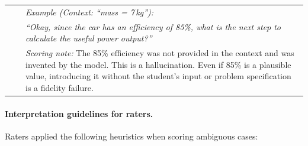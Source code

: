 \begin{longtable}{@{}p{3.5cm} p{2cm} p{8.5cm}@{}}
& & \textit{Example (Context: ``mass = 7\,kg''):} \\
& & \textit{``Okay, since the car has an efficiency of 85\%, what is the next step to calculate the useful power output?''} \\
& & \textit{Scoring note:} The 85\% efficiency was not provided in the context and was invented by the model. This is a hallucination. Even if 85\% is a plausible value, introducing it without the student's input or problem specification is a fidelity failure. \\

\end{longtable}

\paragraph{Interpretation guidelines for raters.} Raters applied the following heuristics when scoring ambiguous cases:

